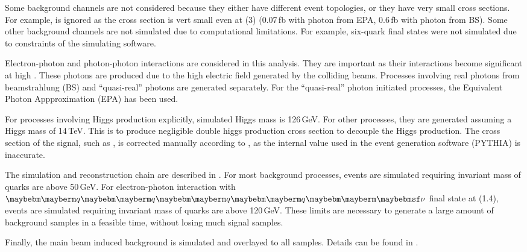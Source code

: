 Some background channels are not considered because they either have different event topologies, or they have very small cross sections. For example,  \egamma{\Pepm}{\Pphoton}{}{\Pquark \Pquark \PHiggs \Plepton} is ignored as the cross section is vert small even at \rootS(3) (0.07\,fb with photon from EPA, 0.6\,fb with photon from BS). Some other background channels are not simulated due to computational limitations. For example, six-quark final states were not simulated due to constraints of the simulating software.

Electron-photon and photon-photon interactions are considered in this analysis. They are important as their interactions become significant at high \sqrtS. These photons are produced due to the high electric field generated by the colliding beams. Processes involving real photons from beamstrahlung (BS) and ``quasi-real'' photons are generated separately. For the ``quasi-real'' photon initiated processes, the Equivalent Photon Appproximation (EPA) has been used.

For processes involving Higgs production explicitly, simulated Higgs mass is 126\,GeV. For other processes,  they are generated assuming a Higgs mass of 14\,TeV. This is to  produce negligible double higgs production cross section to decouple the Higgs production. The cross section of the signal, such as \eeToHHbbWW, is corrected manually according to \cite{Dittmaier:2012vm}, as the internal value used in the event generation software (PYTHIA) is inaccurate.


The simulation and reconstruction chain are described in . For most background processes, events are simulated requiring invariant mass of quarks are above 50\,GeV. For electron-photon interaction with $\Pquark\Pquark\Pquark\Pquark\Pnu$ final state at \rootS(1.4), events are simulated requiring invariant mass of quarks are above 120\,GeV. These limits are necessary to generate a large amount of background samples in a feasible time, without losing much signal samples.

Finally, the main beam induced background \ggHad is simulated and overlayed to all samples. Details can be found in \Section{}.


